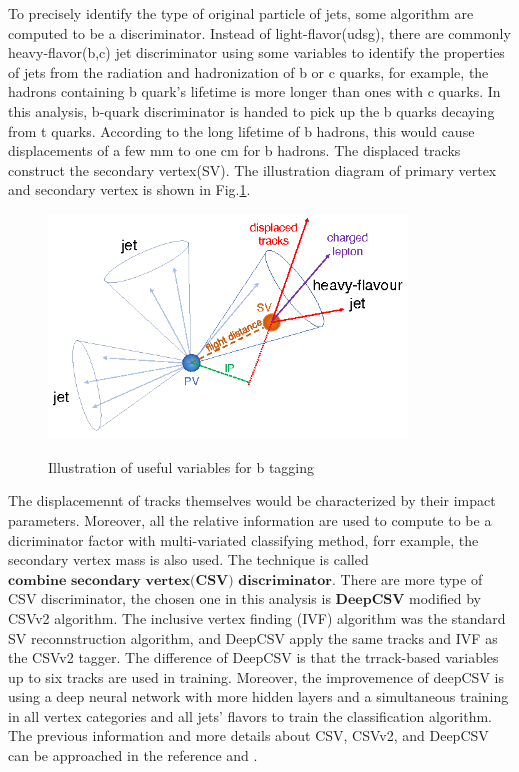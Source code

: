 			To precisely identify the type of original particle of jets, some algorithm are computed to be a discriminator. Instead of light-flavor(udsg), there are commonly heavy-flavor(b,c) jet discriminator using some variables to identify the properties of jets from the radiation and hadronization of b or c quarks, for example, the hadrons containing b quark's lifetime is more longer than ones with c quarks. In this analysis, b-quark discriminator is handed to pick up the b quarks decaying from t quarks. According to the long lifetime of b hadrons, this would cause displacements of a few mm to one cm for b hadrons. The displaced tracks construct the secondary vertex(SV). The illustration diagram of primary vertex and secondary vertex is shown in Fig.\ref{PhysObj:fig:PV_SV}. 

			\begin{figure}[H]
			\centering{}
		    	\includegraphics[width=0.85\textwidth]{Figures/PhysObj/PV_SV.png}\\
			\caption{Illustration of useful variables for b tagging \cite{CMS-BTV-16-002}}
			\label{PhysObj:fig:PV_SV}
			\end{figure}
			\FloatBarrier

			The displacemennt of tracks themselves would be characterized by their impact parameters. Moreover, all the relative information are used to compute to be a dicriminator factor with multi-variated classifying method, forr example, the secondary vertex mass is also used. The technique is called $\textbf{combine secondary vertex(CSV) discriminator}$. There are more type of CSV discriminator, the chosen one in this analysis is $\textbf{DeepCSV}$ modified by CSVv2 algorithm. The inclusive vertex finding (IVF) algorithm was the standard SV reconnstruction algorithm, and DeepCSV apply the same tracks and IVF as the CSVv2 tagger. The difference of DeepCSV is that the trrack-based variables up to six tracks are used in training. Moreover, the improvemence of deepCSV is using a deep neural network with more hidden layers and a simultaneous training in all vertex categories and all jets' flavors to train the classification algorithm. The previous information and more details about CSV, CSVv2, and DeepCSV can be approached in the reference \cite{CMS-PAS-BTV-15-001} and \cite{CMS-BTV-16-002}.

